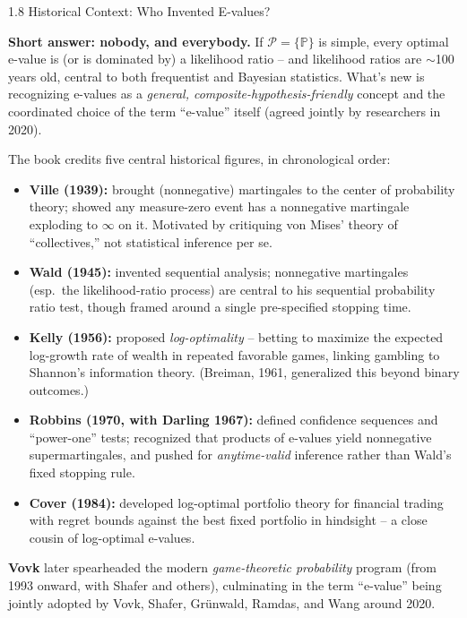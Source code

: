 \documentclass[aspectratio=169,10pt]{beamer}
\begin{document}
\begin{frame}[allowframebreaks]{1.8 Historical Context: Who Invented E-values?}

\textbf{Short answer: nobody, and everybody.} If $\mathcal{P}=\{\mathbb{P}\}$
is simple, every optimal e-value is (or is dominated by) a likelihood
ratio -- and likelihood ratios are $\sim$100 years old, central to both
frequentist and Bayesian statistics. What's new is recognizing e-values as
a \emph{general, composite-hypothesis-friendly} concept and the coordinated
choice of the term ``e-value'' itself (agreed jointly by researchers in
2020).

\medskip
The book credits five central historical figures, in chronological order:

\begin{itemize}
  \item \textbf{Ville (1939):} brought (nonnegative) martingales to the
    center of probability theory; showed any measure-zero event has a
    nonnegative martingale exploding to $\infty$ on it. Motivated by
    critiquing von Mises' theory of ``collectives,'' not statistical
    inference per se.
  \item \textbf{Wald (1945):} invented sequential analysis; nonnegative
    martingales (esp.\ the likelihood-ratio process) are central to his
    sequential probability ratio test, though framed around a single
    pre-specified stopping time.
\end{itemize}

\framebreak

\begin{itemize}
  \item \textbf{Kelly (1956):} proposed \emph{log-optimality} -- betting to
    maximize the expected log-growth rate of wealth in repeated favorable
    games, linking gambling to Shannon's information theory. (Breiman,
    1961, generalized this beyond binary outcomes.)
  \item \textbf{Robbins (1970, with Darling 1967):} defined confidence
    sequences and ``power-one'' tests; recognized that products of
    e-values yield nonnegative supermartingales, and pushed for
    \emph{anytime-valid} inference rather than Wald's fixed stopping rule.
  \item \textbf{Cover (1984):} developed log-optimal portfolio theory for
    financial trading with regret bounds against the best fixed portfolio
    in hindsight -- a close cousin of log-optimal e-values.
\end{itemize}

\medskip
\textbf{Vovk} later spearheaded the modern \emph{game-theoretic
probability} program (from 1993 onward, with Shafer and others),
culminating in the term ``e-value'' being jointly adopted by Vovk, Shafer,
Grünwald, Ramdas, and Wang around 2020.

\end{frame}
\end{document}

